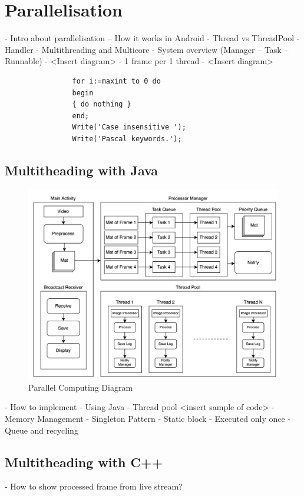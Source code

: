     \section{Parallelisation}
        -	Intro about parallelisation – How it works in Android
            - Thread vs ThreadPool
            - Handler
        -	Multithreading and Multicore
        -	System overview (Manager – Task – Runnable)
            - <Insert diagram>
        -	1 frame per 1 thread
            - <Insert diagram>
            \begin{lstlisting}
                for i:=maxint to 0 do
                begin
                { do nothing }
                end;
                Write('Case insensitive ');
                Write('Pascal keywords.');
            \end{lstlisting}

        \subsection{Multitheading with Java}

            \begin{figure}[!ht]
                \includegraphics[width=6in]{images/chapter3/parallel.png}
                \caption{Parallel Computing Diagram}
                \label{systemOverview}
            \end{figure}
            -	How to implement
                - Using Java
                - Thread pool
                    <insert sample of code>
            -	Memory Management
                - Singleton Pattern
                - Static block
                    - Executed only once
                - Queue and recycling

        \subsection{Multitheading with C++}

        - How to show processed frame from live stream?
